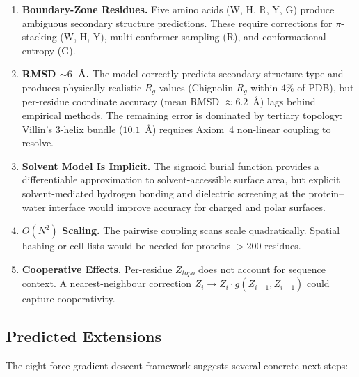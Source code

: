 \begin{enumerate}
    \item \textbf{Boundary-Zone Residues.} Five amino acids (W, H, R, Y, G) produce ambiguous secondary structure predictions. These require corrections for $\pi$-stacking (W, H, Y), multi-conformer sampling (R), and conformational entropy (G).
    \item \textbf{RMSD $\sim 6$~\AA.} The model correctly predicts secondary structure type and produces physically realistic $R_g$ values (Chignolin $R_g$ within 4\% of PDB), but per-residue coordinate accuracy (mean RMSD $\approx 6.2$~\AA) lags behind empirical methods. The remaining error is dominated by tertiary topology: Villin's 3-helix bundle ($10.1$~\AA) requires Axiom~4 non-linear coupling to resolve.
    \item \textbf{Solvent Model Is Implicit.} The sigmoid burial function provides a differentiable approximation to solvent-accessible surface area, but explicit solvent-mediated hydrogen bonding and dielectric screening at the protein--water interface would improve accuracy for charged and polar surfaces.
    \item \textbf{$O(N^2)$ Scaling.} The pairwise coupling scans scale quadratically. Spatial hashing or cell lists would be needed for proteins $> 200$ residues.
    \item \textbf{Cooperative Effects.} Per-residue $Z_{topo}$ does not account for sequence context. A nearest-neighbour correction $Z_i \to Z_i \cdot g(Z_{i-1}, Z_{i+1})$ could capture cooperativity.
\end{enumerate}

\subsection{Predicted Extensions}
\label{sec:protein_bridge}

The eight-force gradient descent framework suggests several concrete next steps:

